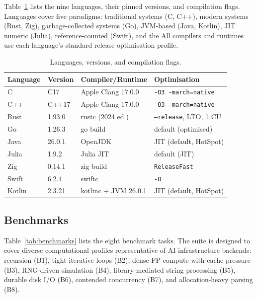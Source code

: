 \documentclass[10pt,conference]{IEEEtran}
\begin{document}
Table~\ref{tab:languages} lists the nine languages, their pinned
versions, and compilation flags. Languages cover five paradigms:
traditional systems (C, C++), modern systems (Rust, Zig),
garbage-collected systems (Go), JVM-based (Java, Kotlin), JIT
numeric (Julia), reference-counted (Swift), and the
All compilers and
runtimes use each language's standard release optimisation profile.

\begin{table}[h]
\caption{Languages, versions, and compilation flags.}
\label{tab:languages}
\centering
\small
\begin{tabular}{llll}
\toprule
\textbf{Language} & \textbf{Version} & \textbf{Compiler/Runtime} & \textbf{Optimisation} \\
\midrule
C       & C17     & Apple Clang 17.0.0   & \texttt{-O3 -march=native} \\
C++     & C++17   & Apple Clang 17.0.0   & \texttt{-O3 -march=native} \\
Rust    & 1.93.0  & rustc (2024 ed.)     & \texttt{--release}, LTO, 1 CU \\
Go      & 1.26.3  & go build             & default (optimised) \\
Java    & 26.0.1  & OpenJDK              & JIT (default, HotSpot) \\
Julia   & 1.9.2   & Julia JIT            & default (JIT) \\
Zig     & 0.14.1  & zig build            & \texttt{ReleaseFast} \\
Swift   & 6.2.4   & swiftc               & \texttt{-O} \\
Kotlin  & 2.3.21  & kotlinc + JVM 26.0.1 & JIT (default, HotSpot) \\
\bottomrule
\end{tabular}
\end{table}

\subsection{Benchmarks}

Table~\ref{tab:benchmarks} lists the eight benchmark tasks. The
suite is designed to cover diverse computational profiles
representative of AI infrastructure backends: recursion (B1), tight
iterative loops (B2), dense FP compute with cache pressure (B3),
RNG-driven simulation (B4), library-mediated string processing
(B5), durable disk I/O (B6), contended concurrency (B7), and
allocation-heavy parsing (B8).
\end{document}
